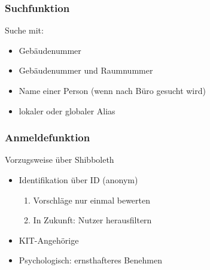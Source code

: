 \begin{frame}\frametitle{Suchfunktion}
    Suche mit:
    \begin{itemize}
        \item Gebäudenummer
        \item Gebäudenummer und Raumnummer
        \item Name einer Person (wenn nach Büro gesucht wird)
        \item lokaler oder globaler Alias
    \end{itemize}
\end{frame}

\begin{frame}\frametitle{Anmeldefunktion}
    Vorzugsweise über Shibboleth
    \begin{itemize}
        \item Identifikation über ID (anonym)
              \begin{enumerate}
                  \item Vorschläge nur einmal bewerten
                  \item In Zukunft: Nutzer herausfiltern
              \end{enumerate}
        \item KIT-Angehörige
        \item Psychologisch: ernsthafteres Benehmen
    \end{itemize}
\end{frame}

\begin{frame}\frametitle{Globalen Alias hinzufügen}
    \begin{figure}
        \texttt{[image: \\relimgfile\{Alias\_Prozess.png]}}
        \vfill\null
    \end{figure}
    \vfill\null
\end{frame}

